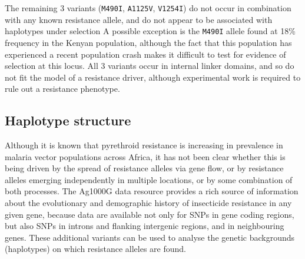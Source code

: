 \documentclass[a4paper,11pt,abstracton,hidelinks]{scrartcl}
\begin{document}
%
The remaining 3 variants (\texttt{M490I}, \texttt{A1125V}, \texttt{V1254I}) do not occur in combination with any known resistance allele, and do not appear to be associated with haplotypes under selection \cite{Ag1000gConsortium2017}
%
A possible exception is the \texttt{M490I} allele found at 18\% frequency in the Kenyan population, although the fact that this population has experienced a recent population crash makes it difficult to test for evidence of selection at this locus.
%
All 3 variants occur in internal linker domains, and so do not fit the model of a resistance driver, although experimental work is required to rule out a resistance phenotype.
%


\subsection*{Haplotype structure}


Although it is known that pyrethroid resistance is increasing in prevalence in malaria vector populations across Africa, it has not been clear whether this is being driven by the spread of resistance alleles via gene flow, or by resistance alleles emerging independently in multiple locations, or by some combination of both processes.
%
The Ag1000G data resource provides a rich source of information about the evolutionary and demographic history of insecticide resistance in any given gene, because data are available not only for SNPs in gene coding regions, but also SNPs in introns and flanking intergenic regions, and in neighbouring genes.
%
These additional variants can be used to analyse the genetic backgrounds (haplotypes) on which resistance alleles are found.
\end{document}
